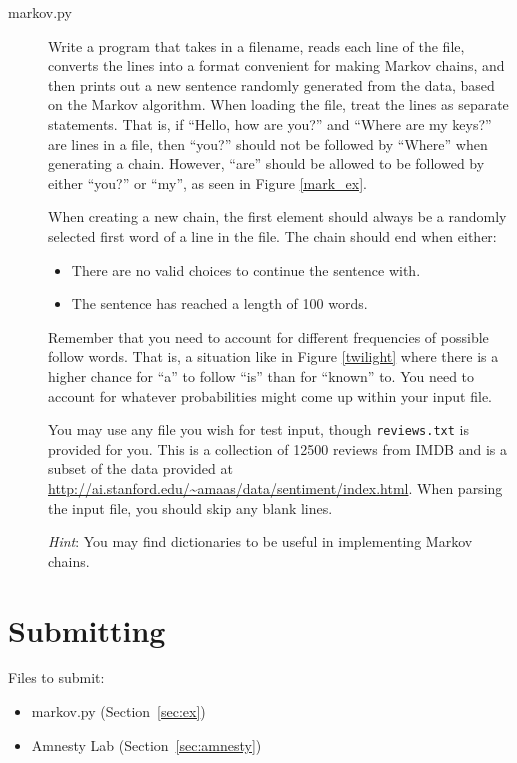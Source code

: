 \documentclass[11pt]{cselabheader}
\begin{document}
\begin{description}
\item[markov.py] Write a program that takes in a filename, reads each line of the file, converts the lines into a format convenient for making Markov chains, and then prints out a new sentence randomly generated from the data, based on the Markov algorithm. When loading the file, treat the lines as separate statements. That is, if ``Hello, how are you?'' and ``Where are my keys?'' are lines in a file, then ``you?'' should not be followed by ``Where'' when generating a chain. However, ``are'' should be allowed to be followed by either ``you?'' or ``my'', as seen in Figure \ref{mark_ex}.

  When creating a new chain, the first element should always be a randomly selected first word of a line in the file. The chain should end when either:
  \begin{itemize}
  \item There are no valid choices to continue the sentence with.
  \item The sentence has reached a length of 100 words.
  \end{itemize}

  Remember that you need to account for different frequencies of possible
  follow words. That is, a situation like in Figure \ref{twilight} where
  there is a higher chance for ``a'' to follow ``is'' than for ``known''
  to. You need to account for whatever probabilities might come up within
  your input file.

  You may use any file you wish for test input, though \lstinline{reviews.txt} is provided for you. This is a collection of 12500 reviews from IMDB and is a subset of the data provided at \url{http://ai.stanford.edu/~amaas/data/sentiment/index.html}. When parsing the input file, you should skip any blank lines.

  \emph{Hint}: You may find dictionaries to be useful in implementing
  Markov chains.

\end{description}

\pagebreak
\section{Submitting}

Files to submit:
\begin{itemize}
\item markov.py (Section~\ref{sec:ex})
\item Amnesty Lab (Section~\ref{sec:amnesty})
\end{itemize}
\end{document}
